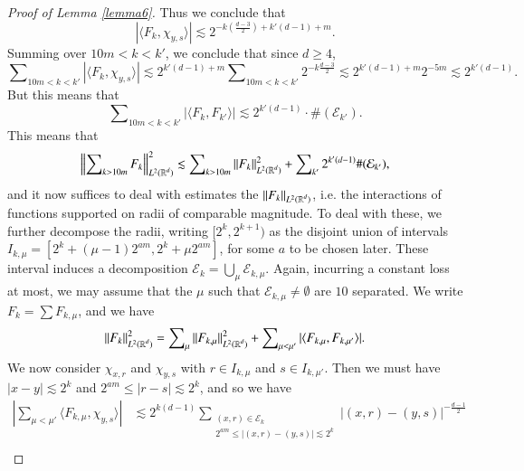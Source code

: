 \begin{proof}[Proof of Lemma \ref{lemma6}]
    Thus we conclude that
    \begin{equation}
      |\langle F_k, \chi_{y,s} \rangle| \lesssim 2^{-k ( \frac{d-3}{2} ) + k'(d-1) + m }.
    \end{equation}
    Summing over $10m < k < k'$, we conclude that since $d \geq 4$,
    \begin{equation}
      \sum\nolimits_{10m < k < k'} |\langle F_k, \chi_{y,s} \rangle| \lesssim 2^{k'(d-1) + m} \sum\nolimits_{10m < k < k'} 2^{-k \frac{d-3}{2}} \lesssim 2^{k'(d-1) + m} 2^{-5m} \lesssim 2^{k'(d-1)}.
    \end{equation}
    But this means that
    \begin{equation}
      \sum\nolimits_{10m < k < k'} |\langle F_k, F_{k'} \rangle| \lesssim 2^{k'(d-1)} \cdot \# ( \mathcal{E}_{k'} ).
    \end{equation}
    This means that
    \begin{equation} \label{awiodjwaoidfjawoid12343124134123453}
      \left\| \sum\nolimits_{k > 10m} F_k \right\|_{L^2(\operatorname{\mathbb{R}}^d)}^2 \lesssim \sum\nolimits_{k > 10m} \| F_k \|_{L^2(\operatorname{\mathbb{R}}^d)}^2 + \sum\nolimits_{k'} 2^{k'(d-1)} \# (\mathcal{E}_{k'}),
    \end{equation}
    and it now suffices to deal with estimates the $\| F_k \|_{L^2(\operatorname{\mathbb{R}}^d)}$, i.e. the interactions of functions supported on radii of comparable magnitude. To deal with these, we further decompose the radii, writing $[2^k,2^{k+1})$ as the disjoint union of intervals $I_{k,\mu} = [2^k + (\mu - 1) 2^{am}, 2^k + \mu 2^{am}]$, for some $a$ to be chosen later. These interval induces a decomposition $\mathcal{E}_k = \bigcup_\mu \mathcal{E}_{k,\mu}$. Again, incurring a constant loss at most, we may assume that the $\mu$ such that $\mathcal{E}_{k,\mu} \neq \emptyset$ are $10$ separated. We write $F_k = \sum F_{k,\mu}$, and we have
    \begin{equation}
      \| F_k \|_{L^2(\operatorname{\mathbb{R}}^d)}^2 = \sum\nolimits_\mu \| F_{k,\mu} \|_{L^2(\operatorname{\mathbb{R}}^d)}^2 + \sum\nolimits_{\mu < \mu'} |\langle F_{k,\mu}, F_{k,\mu'} \rangle|.
    \end{equation}
    We now consider $\chi_{x,r}$ and $\chi_{y,s}$ with $r \in I_{k,\mu}$ and $s \in I_{k,\mu'}$. Then we must have $|x - y| \lesssim 2^k$ and $2^{am} \leq |r - s| \lesssim 2^k$, and so we have
    \begin{equation}
    \begin{split}
        \left| \sum\nolimits_{\mu < \mu'} \langle F_{k,\mu}, \chi_{y,s} \rangle \right| &\lesssim 2^{k(d-1)} \sum\nolimits_{\substack{(x,r) \in \mathcal{E}_k\\ 2^{am} \leq |(x,r) - (y,s)| \lesssim 2^k}} |(x,r) - (y,s)|^{- \frac{d-1}{2}}\\

\end{split}
\end{equation}
\end{proof}
